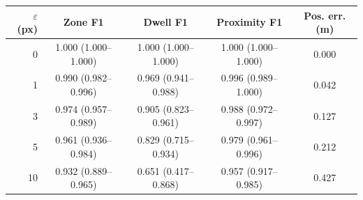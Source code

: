 \begin{tabular}{rcccc}
\toprule
$\varepsilon$ (px) & Zone F1 & Dwell F1 & Proximity F1 & Pos. err. (m) \\
\midrule
0 & 1.000 (1.000–1.000) & 1.000 (1.000–1.000) & 1.000 (1.000–1.000) & 0.000 \\
1 & 0.990 (0.982–0.996) & 0.969 (0.941–0.988) & 0.996 (0.989–1.000) & 0.042 \\
3 & 0.974 (0.957–0.989) & 0.905 (0.823–0.961) & 0.988 (0.972–0.997) & 0.127 \\
5 & 0.961 (0.936–0.984) & 0.829 (0.715–0.934) & 0.979 (0.961–0.996) & 0.212 \\
10 & 0.932 (0.889–0.965) & 0.651 (0.417–0.868) & 0.957 (0.917–0.985) & 0.427 \\
\bottomrule
\end{tabular}
